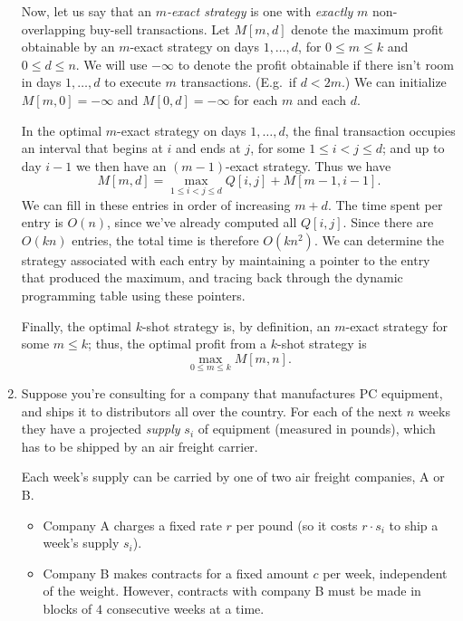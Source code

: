 \documentclass[12pt]{article}
\begin{document}
\begin{enumerate}
{Now, let us say that an {\em $m$-exact strategy}
is one with {\em exactly} $m$ non-overlapping buy-sell transactions.
Let $M[m,d]$ denote the maximum profit obtainable
by an $m$-exact strategy on days $1, \ldots, d$,
for $0 \leq m \leq k$ and $0 \leq d \leq n$.
We will use $-\infty$ to denote the profit obtainable
if there isn't room in days $1, \ldots, d$ to execute
$m$ transactions.  (E.g.~if $d < 2m$.)
We can initialize $M[m,0] = -\infty$ and $M[0,d] = -\infty$
for each $m$ and each $d$.

In the optimal $m$-exact strategy on days
$1, \ldots, d$, the final transaction occupies an
interval that begins at $i$ and ends at $j$,
for some $1 \leq i < j \leq d$;
and up to day $i-1$ we then have an $(m-1)$-exact strategy.
Thus we have
$$M[m,d] = \max_{1 \leq i < j \leq d} Q[i,j] + M[m-1,i-1].$$
We can fill in these entries in order of increasing $m + d$.
The time spent per entry is $O(n)$,
since we've already computed all $Q[i,j]$.
Since there are $O(kn)$ entries, the total time is therefore $O(kn^2)$.
We can determine the strategy associated with
each entry by maintaining a pointer to the entry
that produced the maximum, and tracing back through
the dynamic programming table using these pointers.

Finally, the optimal $k$-shot strategy is, by definition,
an $m$-exact strategy for some $m \leq k$;
thus, the optimal profit from a $k$-shot strategy is
$$\max_{0 \leq m \leq k} M[m,n].$$
}





\item

Suppose you're consulting for a company that manufactures
PC equipment, and ships it to distributors all over the country.
For each of the next $n$ weeks they have a projected
{\em supply} $s_i$ of equipment (measured in pounds),
which has to be shipped by an air freight carrier.

Each week's supply can be carried by one of two air freight companies, A or B.
\begin{itemize}
\item Company A charges a fixed rate $r$ per pound
(so it costs $r \cdot s_i$ to ship a week's supply $s_i$).
\item Company B makes contracts for a fixed amount $c$ per week,
independent of the weight.  However, contracts with
company B must be made in blocks of $4$ consecutive weeks at a time.
\end{itemize}


\end{enumerate}
\end{document}
